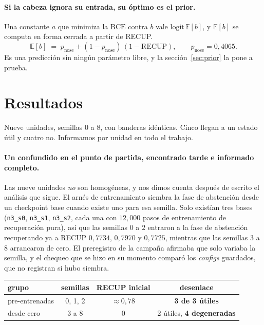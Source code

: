 \documentclass[11pt,a4paper]{article}
\begin{document}
\paragraph{Si la cabeza ignora su entrada, su óptimo es el prior.} Una constante $a$ que minimiza la
$\mathrm{BCE}$ contra $b$ vale $\mathrm{logit}\,\mathbb{E}[b]$, y $\mathbb{E}[b]$ se computa en forma
cerrada a partir de RECUP.
\begin{equation}
\mathbb{E}[b] \;=\; p_{\mathrm{nose}} + (1 - p_{\mathrm{nose}})\,(1 - \mathrm{RECUP}),
\qquad p_{\mathrm{nose}} = 0{,}4065 .
\label{eq:prior}
\end{equation}
Es una predicción sin ningún parámetro libre, y la sección~\ref{sec:prior} la pone a prueba.

\section{Resultados}

Nueve unidades, semillas $0$ a $8$, con banderas idénticas. Cinco llegan a un estado útil y cuatro no.
Informamos por unidad en todo el trabajo.

\paragraph{Un confundido en el punto de partida, encontrado tarde e informado completo.} Las nueve
unidades \emph{no} son homogéneas, y nos dimos cuenta después de escrito el análisis que sigue. El
arnés de entrenamiento siembra la fase de abstención desde un checkpoint base cuando existe uno para
esa semilla. Solo existían tres bases (\texttt{n3\_s0}, \texttt{n3\_s1}, \texttt{n3\_s2}, cada una con
$12{,}000$ pasos de entrenamiento de recuperación pura), así que las semillas $0$ a $2$ entraron a la
fase de abstención recuperando ya a RECUP $0{,}7734$, $0{,}7970$ y $0{,}7725$, mientras que las
semillas $3$ a $8$ arrancaron de cero. El preregistro de la campaña afirmaba que solo variaba la
semilla, y el chequeo que se hizo en su momento comparó los \emph{configs} guardados, que no registran
si hubo siembra.

\begin{center}
\begin{tabular}{lccc}
\toprule
grupo & semillas & RECUP inicial & desenlace \\
\midrule
pre-entrenadas & 0, 1, 2 & $\approx 0{,}78$ & \textbf{3 de 3 útiles} \\
desde cero & 3 a 8 & $0$ & 2 útiles, \textbf{4 degeneradas} \\
\bottomrule
\end{tabular}
\end{center}
\end{document}
